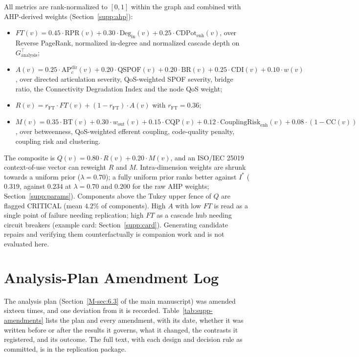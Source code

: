 \documentclass[preprint,3p]{elsarticle}
\begin{document}
\noindent All metrics are rank-normalized to $[0, 1]$ within the graph and combined with AHP-derived weights (Section~\ref{supp:ahp}):
\begin{itemize}
    \item $FT(v) = 0.45 \cdot \text{RPR}(v) + 0.30 \cdot \text{Deg}_{\text{in}}(v) + 0.25 \cdot \text{CDPot}_{\text{enh}}(v)$, over Reverse PageRank, normalized in-degree and normalized cascade depth on $G_{\text{analysis}}^\top$;
    \item $A(v) = 0.25 \cdot \text{AP}_c^{\text{dir}}(v) + 0.20 \cdot \text{QSPOF}(v) + 0.20 \cdot \text{BR}(v) + 0.25 \cdot \text{CDI}(v) + 0.10 \cdot w(v)$, over directed articulation severity, QoS-weighted SPOF severity, bridge ratio, the Connectivity Degradation Index and the node QoS weight;
    \item $R(v) = r_{\text{FT}} \cdot FT(v) + (1 - r_{\text{FT}}) \cdot A(v)$ with $r_{\text{FT}} = 0.36$;
    \item $M(v) = 0.35 \cdot \text{BT}(v) + 0.30 \cdot w_{\text{out}}(v) + 0.15 \cdot \text{CQP}(v) + 0.12 \cdot \text{CouplingRisk}_{\text{enh}}(v) + 0.08 \cdot (1 - \text{CC}(v))$, over betweenness, QoS-weighted efferent coupling, code-quality penalty, coupling risk and clustering.
\end{itemize}
The composite is $Q(v) = 0.80 \cdot R(v) + 0.20 \cdot M(v)$, and an ISO/IEC 25019 context-of-use vector can reweight $R$ and $M$. Intra-dimension weights are shrunk towards a uniform prior ($\lambda = 0.70$); a fully uniform prior ranks better against $I^*$ ($0.319$, against $0.234$ at $\lambda = 0.70$ and $0.200$ for the raw AHP weights; Section~\ref{supp:params}). Components above the Tukey upper fence of $Q$ are flagged CRITICAL (mean $4.2\%$ of components). High $A$ with low $FT$ is read as a single point of failure needing replication; high $FT$ as a cascade hub needing circuit breakers (example card: Section~\ref{supp:card}). Generating candidate repairs and verifying them counterfactually is companion work and is not evaluated here.

\section{Analysis-Plan Amendment Log}
\label{supp:amendments}

The analysis plan (Section~\ref{M-sec:6.3} of the main manuscript) was amended sixteen times, and one deviation from it is recorded. Table~\ref{tab:supp-amendments} lists the plan and every amendment, with its date, whether it was written before or after the results it governs, what it changed, the contrasts it registered, and its outcome. The full text, with each design and decision rule as committed, is  in the replication package.
\end{document}
